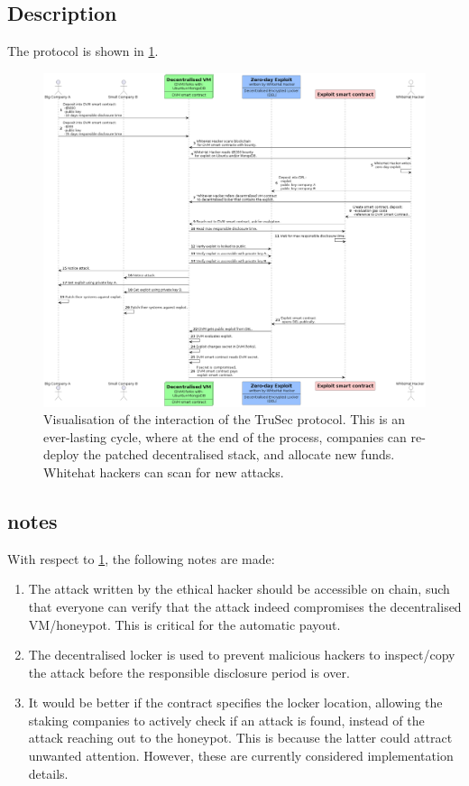 \subsection{Description}
The protocol is shown in \cref{fig:interaction}.
\begin{figure}[H]
    \centering
    \includegraphics[width=1.0\textwidth]{latex/Images/Diagrams/interaction.png}
    \caption{Visualisation of the interaction of the TruSec protocol. This is an ever-lasting cycle, where at the end of the process, companies can re-deploy the patched decentralised stack, and allocate new funds. Whitehat hackers can scan for new attacks.}
    \label{fig:interaction}
\end{figure}
\noindent 




\subsection{ notes}
With respect to \cref{fig:interaction}, the following notes are made:
\begin{enumerate} 
    \item The attack written by the ethical hacker should be accessible on chain, such that everyone can verify that the attack indeed compromises the decentralised VM/honeypot. This is critical for the automatic payout.
    \item The decentralised locker is used to prevent malicious hackers to inspect/copy the attack before the responsible disclosure period is over.
    \item It would be better if the contract specifies the locker location, allowing the staking companies to actively check if an attack is found, instead of the attack reaching out to the honeypot. This is because the latter could attract unwanted attention. However, these are currently considered implementation details.
\end{enumerate}